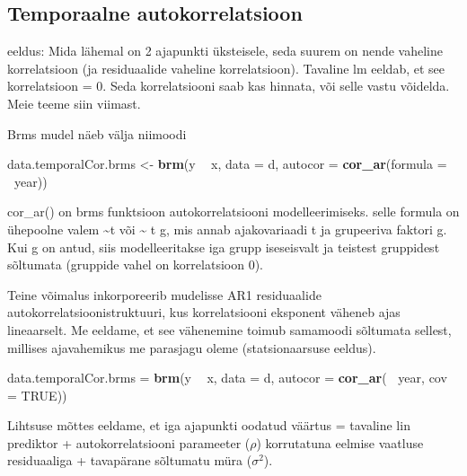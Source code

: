 \documentclass[]{book}
\newenvironment{Shaded}{\begin{snugshade}}{\end{snugshade}}
\newcommand{\DataTypeTok}[1]{\textcolor[rgb]{0.13,0.29,0.53}{#1}}
\newcommand{\KeywordTok}[1]{\textcolor[rgb]{0.13,0.29,0.53}{\textbf{#1}}}
\newcommand{\NormalTok}[1]{#1}
\newcommand{\OperatorTok}[1]{\textcolor[rgb]{0.81,0.36,0.00}{\textbf{#1}}}
\newcommand{\OtherTok}[1]{\textcolor[rgb]{0.56,0.35,0.01}{#1}}
\newcommand{\StringTok}[1]{\textcolor[rgb]{0.31,0.60,0.02}{#1}}
\begin{document}
\hypertarget{temporaalne-autokorrelatsioon}{%
\subsection{Temporaalne autokorrelatsioon}\label{temporaalne-autokorrelatsioon}}

eeldus: Mida lähemal on 2 ajapunkti üksteisele, seda suurem on nende vaheline korrelatsioon (ja residuaalide vaheline korrelatsioon). Tavaline lm eeldab, et see korrelatsioon = 0.
Seda korrelatsiooni saab kas hinnata, või selle vastu võidelda. Meie teeme siin viimast.

Brms mudel näeb välja niimoodi

\begin{Shaded}
\begin{Highlighting}[]
\NormalTok{data.temporalCor.brms <-}\StringTok{  }\KeywordTok{brm}\NormalTok{(y }\OperatorTok{~}\StringTok{ }\NormalTok{x, }\DataTypeTok{data =}\NormalTok{ d, }
                              \DataTypeTok{autocor =} \KeywordTok{cor_ar}\NormalTok{(}\DataTypeTok{formula =} \OperatorTok{~}\NormalTok{year))}
\end{Highlighting}
\end{Shaded}

cor\_ar() on brms funktsioon autokorrelatsiooni modelleerimiseks. selle formula on ühepoolne valem \textasciitilde{}t või \textasciitilde{} t \textbar{} g, mis annab ajakovariaadi t ja grupeeriva faktori g. Kui g on antud, siis modelleeritakse iga grupp iseseisvalt ja teistest gruppidest sõltumata (gruppide vahel on korrelatsioon 0).

Teine võimalus inkorporeerib mudelisse AR1 residuaalide autokorrelatsioonistruktuuri, kus korrelatsiooni eksponent väheneb ajas lineaarselt. Me eeldame, et see vähenemine toimub samamoodi sõltumata sellest, millises ajavahemikus me parasjagu oleme (statsionaarsuse eeldus).

\begin{Shaded}
\begin{Highlighting}[]
\NormalTok{data.temporalCor.brms =}\StringTok{ }\KeywordTok{brm}\NormalTok{(y }\OperatorTok{~}\StringTok{ }\NormalTok{x, }\DataTypeTok{data =}\NormalTok{ d, }
                            \DataTypeTok{autocor =} \KeywordTok{cor_ar}\NormalTok{( }\OperatorTok{~}\NormalTok{year, }\DataTypeTok{cov =} \OtherTok{TRUE}\NormalTok{))}
\end{Highlighting}
\end{Shaded}

Lihtsuse mõttes eeldame, et iga ajapunkti oodatud väärtus = tavaline lin prediktor + autokorrelatsiooni parameeter (\(\rho\)) korrutatuna eelmise vaatluse residuaaliga + tavapärane sõltumatu müra (\(\sigma^2\)).
\end{document}
